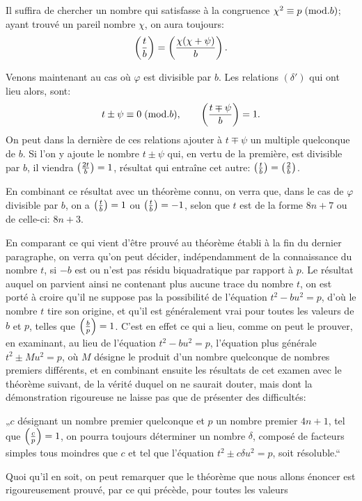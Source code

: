 \par\noindent
Il suffira de chercher un nombre qui satisfasse à la congruence $\chi^2\equiv p\;(\mathrm{mod}.b)$; ayant
trouvé un pareil nombre $\chi$, on aura toujours:
\[
\left(\frac{t}{b}\right)=\left(\frac{\chi(\chi+\psi)}{b}\right).
\]
\par\indent
Venons maintenant au cas où $\varphi$ est divisible par $b$. Les relations $(\delta')$ qui ont
lieu alors, sont:
\[
t\pm\psi\equiv0\;(\mathrm{mod}.b),\qquad
\left(\frac{t\mp\psi}{b}\right)=1.
\]
On peut dans la dernière de ces relations ajouter à $t\mp\psi$ un multiple quelconque de $b$. Si
l'on y ajoute le nombre $t\pm\psi$ qui, en vertu de la première, est divisible par $b$, il viendra
$\left(\frac{2t}{b}\right)=1$, résultat qui entraîne cet autre: $\left(\frac{t}{b}\right)=\left(\frac{2}{b}\right)$.
\par\indent
En combinant ce résultat avec un théorème connu, on verra que, dans le cas de $\varphi$ divisible
par $b$, on a $\left(\frac{t}{b}\right)=1$ ou $\left(\frac{t}{b}\right)=-1$, selon que $t$ est de la forme $8n+7$ ou de
celle-ci: $8n+3$.
\par\indent
En comparant ce qui vient d'être prouvé au théorème établi à la fin du dernier paragraphe, on
verra qu'on peut décider, indépendamment de la connaissance du nombre $t$, si $-b$ est ou n'est
pas résidu biquadratique par rapport à $p$. Le résultat auquel on parvient ainsi ne contenant plus
aucune trace du nombre $t$, on est porté à croire qu'il ne suppose pas la possibilité de
l'équation $t^2-bu^2=p$, d'où le nombre $t$ tire son origine, et qu'il est généralement vrai pour
toutes les valeurs de $b$ et $p$, telles que $\left(\frac{b}{p}\right)=1$. C'est en effet ce qui a lieu, comme
on peut le prouver, en examinant, au lieu de l'équation $t^2-bu^2=p$, l'équation plus générale
$t^2\pm Mu^2=p$, où $M$ désigne le produit d'un nombre quelconque de nombres premiers différents,
et en combinant ensuite les résultats de cet examen avec le théorème suivant, de la vérité duquel
on ne saurait douter, mais dont la démonstration rigoureuse ne laisse pas que de présenter des
difficultés:
\par\indent
„$c$ désignant un nombre premier quelconque et $p$ un nombre premier $4n+1$, tel que
$\left(\frac{c}{p}\right)=1$, on pourra toujours déterminer un nombre $\delta$, composé de facteurs simples tous
moindres que $c$ et tel que l'équation $t^2\pm c\delta u^2=p$, soit résoluble.“
\par\indent
Quoi qu'il en soit, on peut remarquer que le théorème que nous allons énoncer est rigoureusement
prouvé, par ce qui précède, pour toutes les valeurs
